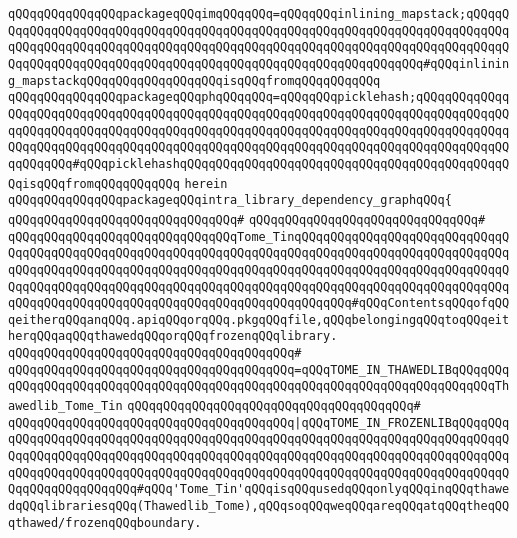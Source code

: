 \verb|qQQqqQQqqQQqqQQqpackageqQQqimqQQqqQQq=qQQqqQQqinlining_mapstack;qQQqqQQqqQQqqQQqqQQqqQQqqQQqqQQqqQQqqQQqqQQqqQQqqQQqqQQqqQQqqQQqqQQqqQQqqQQqqQQqqQQqqQQqqQQqqQQqqQQqqQQqqQQqqQQqqQQqqQQqqQQqqQQqqQQqqQQqqQQqqQQqqQQqqQQqqQQqqQQqqQQqqQQqqQQqqQQqqQQqqQQqqQQqqQQqqQQqqQQqqQQq#qQQqinlining_mapstackqQQqqQQqqQQqqQQqqQQqisqQQqfromqQQqqQQqqQQq|\newline
\verb|qQQqqQQqqQQqqQQqpackageqQQqphqQQqqQQq=qQQqqQQqpicklehash;qQQqqQQqqQQqqQQqqQQqqQQqqQQqqQQqqQQqqQQqqQQqqQQqqQQqqQQqqQQqqQQqqQQqqQQqqQQqqQQqqQQqqQQqqQQqqQQqqQQqqQQqqQQqqQQqqQQqqQQqqQQqqQQqqQQqqQQqqQQqqQQqqQQqqQQqqQQqqQQqqQQqqQQqqQQqqQQqqQQqqQQqqQQqqQQqqQQqqQQqqQQqqQQqqQQqqQQqqQQqqQQqqQQqqQQq#qQQqpicklehashqQQqqQQqqQQqqQQqqQQqqQQqqQQqqQQqqQQqqQQqqQQqqQQqisqQQqfromqQQqqQQqqQQq|\newline
\verb|herein|\newline
\newline
\verb|qQQqqQQqqQQqqQQqpackageqQQqintra_library_dependency_graphqQQq{|\newline
\verb|qQQqqQQqqQQqqQQqqQQqqQQqqQQqqQQq#|\newline
\verb|qQQqqQQqqQQqqQQqqQQqqQQqqQQqqQQq#|\newline
\verb|qQQqqQQqqQQqqQQqqQQqqQQqqQQqqQQqTome_TinqQQqqQQqqQQqqQQqqQQqqQQqqQQqqQQqqQQqqQQqqQQqqQQqqQQqqQQqqQQqqQQqqQQqqQQqqQQqqQQqqQQqqQQqqQQqqQQqqQQqqQQqqQQqqQQqqQQqqQQqqQQqqQQqqQQqqQQqqQQqqQQqqQQqqQQqqQQqqQQqqQQqqQQqqQQqqQQqqQQqqQQqqQQqqQQqqQQqqQQqqQQqqQQqqQQqqQQqqQQqqQQqqQQqqQQqqQQqqQQqqQQqqQQqqQQqqQQqqQQqqQQqqQQqqQQqqQQqqQQqqQQqqQQq#qQQqContentsqQQqofqQQqeitherqQQqanqQQq.apiqQQqorqQQq.pkgqQQqfile,qQQqbelongingqQQqtoqQQqeitherqQQqaqQQqthawedqQQqorqQQqfrozenqQQqlibrary.|\newline
\verb|qQQqqQQqqQQqqQQqqQQqqQQqqQQqqQQqqQQqqQQq#|\newline
\verb|qQQqqQQqqQQqqQQqqQQqqQQqqQQqqQQqqQQqqQQq=qQQqTOME_IN_THAWEDLIBqQQqqQQqqQQqqQQqqQQqqQQqqQQqqQQqqQQqqQQqqQQqqQQqqQQqqQQqqQQqqQQqqQQqqQQqqQQqThawedlib_Tome_Tin|\newline
\verb|qQQqqQQqqQQqqQQqqQQqqQQqqQQqqQQqqQQqqQQq#|\newline
\verb|qQQqqQQqqQQqqQQqqQQqqQQqqQQqqQQqqQQqqQQq|\verb#|qQQqTOME_IN_FROZENLIBqQQqqQQqqQQqqQQqqQQqqQQqqQQqqQQqqQQqqQQqqQQqqQQqqQQqqQQqqQQqqQQqqQQqqQQqqQQqqQQqqQQqqQQqqQQqqQQqqQQqqQQqqQQqqQQqqQQqqQQqqQQqqQQqqQQqqQQqqQQqqQQqqQQqqQQqqQQqqQQqqQQqqQQqqQQqqQQqqQQqqQQqqQQqqQQqqQQqqQQqqQQqqQQqqQQqqQQqqQQqqQQqqQQqqQQqqQQq#\verb|#qQQq'Tome_Tin'qQQqisqQQqusedqQQqonlyqQQqinqQQqthawedqQQqlibrariesqQQq(Thawedlib_Tome),qQQqsoqQQqweqQQqareqQQqatqQQqtheqQQqthawed/frozenqQQqboundary.|\newline
